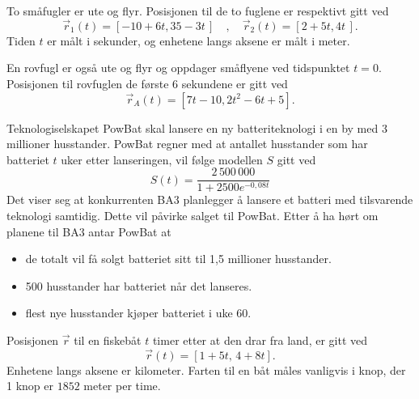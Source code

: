 To småfugler er ute og flyr. Posisjonen til de to fuglene er respektivt gitt ved
\[
\vec{r}_1(t) = [-10 + 6t, 35 - 3t\,]\quad,
\quad
\vec{r}_2(t) = [2 + 5t, 4t\,].
\]
Tiden $t$ er målt i sekunder, og enhetene langs aksene er målt i meter.


En rovfugl er også ute og flyr og oppdager småflyene ved tidspunktet
${t = 0}$. Posisjonen til rovfuglen de første 6 sekundene er gitt ved
\[
\vec{r}_A(t) = [7t - 10, 2t^2 - 6t + 5].
\]

Teknologiselskapet PowBat skal lansere en ny batteriteknologi i en by med 3 millioner
husstander. PowBat regner med at antallet husstander som har batteriet $t$ uker etter
lanseringen, vil følge modellen $S$ gitt ved
\[ S(t) = \frac{2\,500\,000}{1 + 2500e^{-0{,}08t}} \]
Det viser seg at konkurrenten BA3 planlegger å lansere et batteri med tilsvarende teknologi
samtidig. Dette vil påvirke salget til PowBat.
Etter å ha hørt om planene til BA3 antar PowBat at
\begin{itemize}
	\item de totalt vil få solgt batteriet sitt til 1,5 millioner husstander.
	\item 500 husstander har batteriet når det lanseres.
	\item flest nye husstander kjøper batteriet i uke 60.
\end{itemize}

Posisjonen $\vec{r}$ til en fiskebåt $t$ timer etter at den drar fra land, er gitt ved
\[
\vec{r}(t) = [1 + 5t,\, 4 + 8t].
\]
Enhetene langs aksene er kilometer. Farten til en båt måles vanligvis i knop, der 1 knop er $1852$ meter per time.

